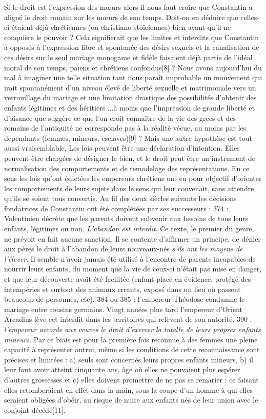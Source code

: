  Si le droit est l'expression des mœurs alors il nous faut croire que Constantin a aligné le droit romain sur les mœurs de son temps. Doit-on en déduire que celles-ci étaient déjà chrétiennes (ou christiano-stoïciennes) bien avant qu'il ne conquière le pouvoir ? Cela signifierait que les limites et interdits que Constantin a opposés à l'expression libre et spontanée des désirs sexuels et la canalisation de ces désirs sur le seul mariage monogame et fidèle faisaient déjà partie de l'idéal moral de son temps, païens et chrétiens confondus[8] ? Nous avons aujourd'hui du mal à imaginer une telle situation tant nous paraît improbable un mouvement qui irait spontanément d'un niveau élevé de liberté sexuelle et matrimoniale vers un verrouillage du mariage et une limitation drastique des possibilités d'obtenir des enfants légitimes et des héritiers ...à moins que l'impression de grande liberté et d'aisance que suggère ce que l'on croit connaître de la vie des grecs et des romains de l'antiquité ne corresponde pas à la réalité vécue, au moins par les dépendants (femmes, mineurs, esclaves)[9] ? 
 Mais une autre hypothèse est tout aussi vraisemblable. Les lois peuvent être une déclaration d'intention. Elles peuvent être chargées de désigner le bien, et le droit peut être un instrument de normalisation des comportements et de remodelage des représentations. En ce sens les lois qu'ont édictées les empereurs chrétiens ont eu pour objectif d'orienter les comportements de leurs sujets dans le sens qui leur convenait, sans attendre qu'ils se soient tous convertis. 
 Au fil des deux siècles suivants les décisions fondatrices de Constantin ont été complétées par ses successeurs : 
 374 : Valentinien décrète que les parents doivent subvenir aux besoins de tous leurs enfants, légitimes ou non. \emph{L'abandon est interdit}. Ce texte, le premier du genre, ne prévoit en fait aucune sanction. Il se contente d'affirmer un principe, de dénier aux pères le droit à l'abandon de leurs nouveaux-nés \emph{s'ils ont les moyens de l'élever}. Il semble n'avoir jamais été utilisé à l'encontre de parents incapables de nourrir leurs enfants, du moment que la vie de ceux-ci n'était pas mise en danger, et que leur découverte avait été facilitée (enfant placé en évidence, protégé des intempéries et surtout des animaux errants, exposé dans un lieu où passent beaucoup de personnes, etc). 
 384 ou 385 : l'empereur Théodose condamne le mariage entre cousins germains. Vingt années plus tard l'empereur d'Orient Arcadius lève cet interdit dans les territoires qui relèvent de son autorité. 
 390 :\emph{ l'empereur accorde aux veuves le droit d'exercer la tutelle de leurs propres enfants mineurs}. Par ce biais est pour la première fois reconnue à des femmes une pleine capacité à représenter autrui, même si les conditions de cette reconnaissance sont précises et limitées : a) seuls sont concernés leurs propres enfants mineurs, b) il leur faut avoir atteint cinquante ans, âge où elles ne pouvaient plus espérer d'autres grossesses et c) elles doivent promettre de ne pas se remarier : ce faisant elles retomberaient en effet dans la main, sous la coupe d'un homme à qui elles seraient obligées d'obéir, au risque de nuire aux enfants nés de leur union avec le conjoint décédé[11].

